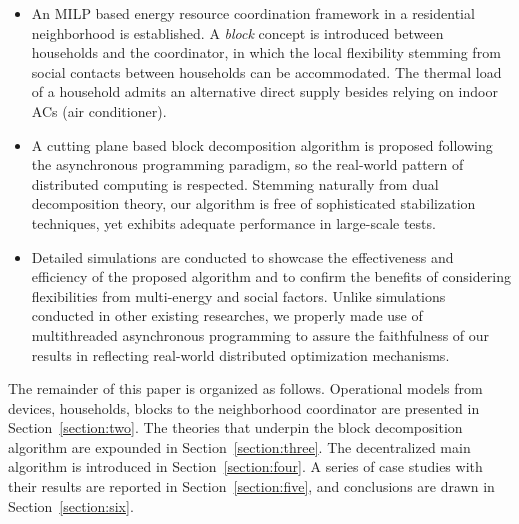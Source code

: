 \documentclass[journal]{IEEEtran}
\begin{document}
\begin{itemize}
    \item An MILP based energy resource coordination framework in a residential neighborhood
    is established. A \textit{block} concept is introduced between households and the coordinator,
    in which the local flexibility stemming from social contacts between households can be accommodated.
    The thermal load of a household admits an alternative direct supply besides relying on indoor ACs (air conditioner).
    \item A cutting plane based block decomposition algorithm is proposed following the
    asynchronous programming paradigm, so the real-world pattern of distributed computing is respected.
    Stemming naturally from dual decomposition theory, our algorithm is free of sophisticated
    stabilization techniques, yet exhibits adequate performance in large-scale tests.
    \item Detailed simulations are conducted to showcase the effectiveness and efficiency of
    the proposed algorithm and to confirm the benefits of considering flexibilities from
    multi-energy and social factors. Unlike simulations conducted in other existing researches,
    we properly made use of multithreaded asynchronous programming to assure the faithfulness
    of our results in reflecting real-world distributed optimization mechanisms.
\end{itemize}
\par
The remainder of this paper is organized as follows.
Operational models from devices, households, blocks to the neighborhood coordinator are presented in Section~\ref{section:two}.
The theories that underpin the block decomposition algorithm are expounded in Section~\ref{section:three}.
The decentralized main algorithm is introduced in Section~\ref{section:four}.
A series of case studies with their results are reported in Section~\ref{section:five},
and conclusions are drawn in Section~\ref{section:six}.
\end{document}
